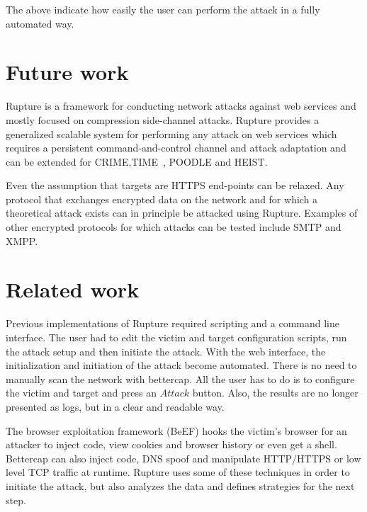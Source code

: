 \documentclass[a4paper, 11 pt, conference]{article}
\begin{document}
The above indicate how easily the user can perform the attack in a fully automated way.

\section{Future work}

Rupture is a framework for conducting network attacks against web services and mostly focused on compression side-channel attacks.  Rupture provides a generalized scalable system for performing any attack on web services which requires a persistent command-and-control channel and attack adaptation and can be extended for CRIME,TIME~\cite{c18}, POODLE and HEIST.

Even the assumption that targets are HTTPS end-points can be relaxed. Any protocol that exchanges encrypted data on the network and for which a theoretical attack exists can in principle be attacked using Rupture. Examples of other encrypted protocols for which attacks can be tested include SMTP and XMPP.


\section{Related work}
Previous implementations of Rupture required scripting and a command line interface. The user had to edit the victim and target configuration scripts, run the attack setup and then initiate the attack. With the web interface, the initialization and initiation of the attack become automated. There is no need to manually scan the network with bettercap. All the user has to do is to configure the victim and target and press an $ Attack $ button. Also, the results are no longer presented as logs, but in a clear and readable way.

The browser exploitation framework (BeEF) hooks the victim's browser for an attacker to inject code, view cookies and browser history or even get a shell. Bettercap can also inject code, DNS spoof and manipulate HTTP/HTTPS or low level TCP traffic at runtime. Rupture uses some of these techniques in order to initiate the attack, but also analyzes the data and defines strategies for the next step.
\end{document}
